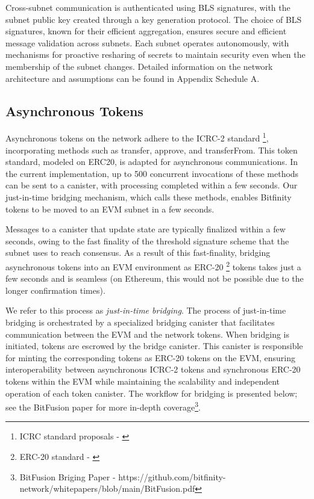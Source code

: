 \documentclass{article}
\begin{document}
Cross-subnet communication is authenticated using BLS signatures, with the subnet public key created through a key generation protocol. The choice of BLS signatures, known for their efficient aggregation, ensures secure and efficient message validation across subnets. Each subnet operates autonomously, with mechanisms for proactive resharing of secrets to maintain security even when the membership of the subnet changes. Detailed information on the network architecture and assumptions can be found in Appendix Schedule A.

\subsection{Asynchronous Tokens}

Asynchronous tokens on the network adhere to the ICRC-2 standard \footnote{ICRC standard proposals - \cite{icrc}}, incorporating methods such as transfer, approve, and transferFrom. This token standard, modeled on ERC20, is adapted for asynchronous communications. In the current implementation, up to 500 concurrent invocations of these methods can be sent to a canister, with processing completed within a few seconds. Our just-in-time bridging mechanism, which calls these methods, enables Bitfinity tokens to be moved to an EVM subnet in a few seconds.

Messages to a canister that update state are typically finalized within a few seconds, owing to the fast finality of the threshold signature scheme that the subnet uses to reach consensus. As a result of this fast-finality, bridging asynchronous tokens into an EVM environment as ERC-20 \footnote{ERC-20 standard - \cite{erc20}} tokens takes just a few seconds and is seamless (on Ethereum, this would not be possible due to the longer confirmation times).

We refer to this process as \textit{just-in-time bridging}. The process of just-in-time bridging is orchestrated by a specialized bridging canister that facilitates communication between the EVM and the network tokens. When bridging is initiated, tokens are escrowed by the bridge canister. This canister is responsible for minting the corresponding tokens as ERC-20 tokens on the EVM, ensuring interoperability between asynchronous ICRC-2 tokens and synchronous ERC-20 tokens within the EVM while maintaining the scalability and independent operation of each token canister. The workflow for bridging is presented below; see the BitFusion paper for more in-depth coverage\footnote{BitFusion Briging Paper - https://github.com/bitfinity-network/whitepapers/blob/main/BitFusion.pdf}.
\end{document}
